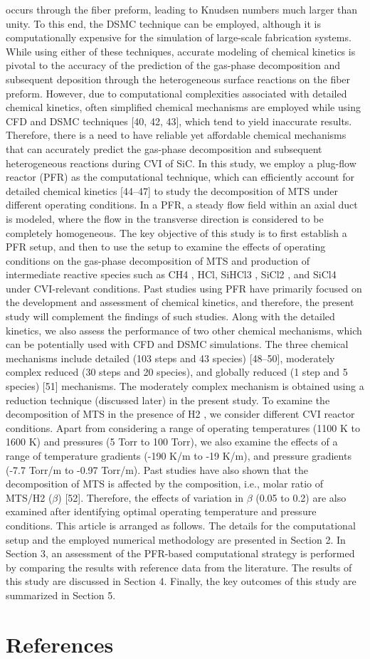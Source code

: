 \documentclass[final, letterpaper, square, comma, numbers, sort&compress]{elsarticle}
\begin{document}
occurs through the fiber preform, leading to Knudsen numbers much larger than unity. To this end, the
DSMC technique can be employed, although it is computationally expensive for the simulation of large-scale
fabrication systems. While using either of these techniques, accurate modeling of chemical kinetics is pivotal
to the accuracy of the prediction of the gas-phase decomposition and subsequent deposition through the
heterogeneous surface reactions on the fiber preform. However, due to computational complexities associated
with detailed chemical kinetics, often simplified chemical mechanisms are employed while using CFD and
DSMC techniques [40, 42, 43], which tend to yield inaccurate results. Therefore, there is a need to have
reliable yet affordable chemical mechanisms that can accurately predict the gas-phase decomposition and
subsequent heterogeneous reactions during CVI of SiC. In this study, we employ a plug-flow reactor (PFR)
as the computational technique, which can efficiently account for detailed chemical kinetics [44–47] to study
the decomposition of MTS under different operating conditions. In a PFR, a steady flow field within an axial
duct is modeled, where the flow in the transverse direction is considered to be completely homogeneous.
The key objective of this study is to first establish a PFR setup, and then to use the setup to examine
the effects of operating conditions on the gas-phase decomposition of MTS and production of intermediate
reactive species such as CH4 , HCl, SiHCl3 , SiCl2 , and SiCl4 under CVI-relevant conditions. Past studies
using PFR have primarily focused on the development and assessment of chemical kinetics, and therefore,
the present study will complement the findings of such studies. Along with the detailed kinetics, we also
assess the performance of two other chemical mechanisms, which can be potentially used with CFD and
DSMC simulations. The three chemical mechanisms include detailed (103 steps and 43 species) [48–50],
moderately complex reduced (30 steps and 20 species), and globally reduced (1 step and 5 species) [51]
mechanisms. The moderately complex mechanism is obtained using a reduction technique (discussed later)
in the present study. To examine the decomposition of MTS in the presence of H2 , we consider different
CVI reactor conditions. Apart from considering a range of operating temperatures (1100 K to 1600 K) and
pressures (5 Torr to 100 Torr), we also examine the effects of a range of temperature gradients (-190 K/m
to -19 K/m), and pressure gradients (-7.7 Torr/m to -0.97 Torr/m). Past studies have also shown that the
decomposition of MTS is affected by the composition, i.e., molar ratio of MTS/H2 ($\beta$) [52]. Therefore, the
effects of variation in $\beta$ (0.05 to 0.2) are also examined after identifying optimal operating temperature and pressure conditions.
This article is arranged as follows. The details for the computational setup and the employed numerical
methodology are presented in Section 2. In Section 3, an assessment of the PFR-based computational
strategy is performed by comparing the results with reference data from the literature. The results of this
study are discussed in Section 4. Finally, the key outcomes of this study are summarized in Section 5.
\section{References}
\label{S.7}



\end{document}
